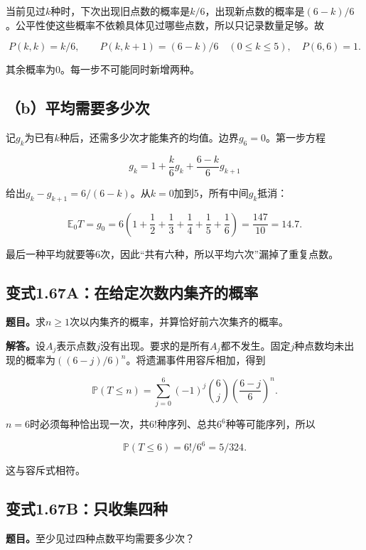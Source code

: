 \documentclass[
  11pt,a4paper,UTF8,fontset=fandol]{ctexart}
\begin{document}
当前见过\(k\)种时，下次出现旧点数的概率是\(k/6\)，出现新点数的概率是\((6-k)/6\)。公平性使这些概率不依赖具体见过哪些点数，所以只记录数量足够。故

\[\boxed{P(k,k)=k/6,\qquad P(k,k+1)=(6-k)/6\quad(0\le k\le5),\quad P(6,6)=1.}\]

其余概率为0。每一步不可能同时新增两种。

\subsection{（b）平均需要多少次}\label{bux5e73ux5747ux9700ux8981ux591aux5c11ux6b21}

记\(g_k\)为已有\(k\)种后，还需多少次才能集齐的均值。边界\(g_6=0\)。第一步方程

\[g_k=1+\frac{k}{6}g_k+\frac{6-k}{6}g_{k+1}\]

给出\(g_k-g_{k+1}=6/(6-k)\)。从\(k=0\)加到5，所有中间\(g_k\)抵消：

\[\boxed{\mathbb E_0T=g_0=6\left(1+\frac12+\frac13+\frac14+\frac15+\frac16\right)=\frac{147}{10}=14.7.}\]

最后一种平均就要等6次，因此``共有六种，所以平均六次''漏掉了重复点数。

\subsection{变式1.67A：在给定次数内集齐的概率}\label{ux53d8ux5f0f1.67aux5728ux7ed9ux5b9aux6b21ux6570ux5185ux96c6ux9f50ux7684ux6982ux7387}

\textbf{题目。}求\(n\ge1\)次以内集齐的概率，并算恰好前六次集齐的概率。

\textbf{解答。}设\(A_j\)表示点数\(j\)没有出现。要求的是所有\(A_j\)都不发生。固定\(j\)种点数均未出现的概率为\(((6-j)/6)^n\)。将遗漏事件用容斥相加，得到

\[\boxed{\mathbb P(T\le n)=\sum_{j=0}^6(-1)^j\binom6j\left(\frac{6-j}{6}\right)^n.}\]

\(n=6\)时必须每种恰出现一次，共\(6!\)种序列、总共\(6^6\)种等可能序列，所以

\[\boxed{\mathbb P(T\le6)=6!/6^6=5/324}.\]

这与容斥式相符。

\subsection{变式1.67B：只收集四种}\label{ux53d8ux5f0f1.67bux53eaux6536ux96c6ux56dbux79cd}

\textbf{题目。}至少见过四种点数平均需要多少次？
\end{document}
